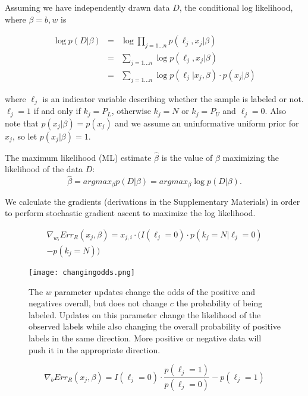 \documentclass{article}
\begin{document}
Assuming we have independently drawn data $D$, the conditional log likelihood, where $\beta = b, w$ is

\begin{eqnarray*}
\log{p(D | \beta)} &=& \log \prod_{j=1...n}{p(\ell_j, x_j | \beta)} \\
 &=& \sum_{j=1...n}{\log{p(\ell_j, x_j | \beta)}} \\
 &=& \sum_{j=1...n}{\log{p(\ell_j | x_j, \beta)}} \cdot p(x_j | \beta)
\end{eqnarray*}

where $\ell_j$ is an indicator variable describing whether the sample is labeled or not. $\ell_j = 1$ if and only if $k_j=P_L$, otherwise $k_j = N$ or $k_j=P_U$ and $\ell_j = 0$.  Also note that $p(x_j|\beta) = p(x_j)$ and we assume an uninformative uniform prior for $x_j$, so let $p(x_j|\beta) = 1$.

The maximum likelihood (ML) estimate $\hat \beta$ is the value of $\beta$ maximizing the likelihood of the data $D$:
$$
\hat \beta = arg max_{\beta} p(D | \beta) = arg max_{\beta} \log{p(D | \beta)}.
$$

We calculate the gradients (derivations in the Supplementary Materials) in order to perform stochastic gradient ascent to maximize the log likelihood.

\begin{eqnarray*}
\nabla_{w_i}{Err_R (x_j, \beta)} = x_{j,i} \cdot
    \big(	I(\ell_j=0) \cdot p(k_j=N | \ell_j=0) \\
		- p(k_j=N)
    \big)
\end{eqnarray*}

\begin{figure}[ht!]
\vskip 0.2in
\begin{center}
\centerline{\texttt{[image: changingodds.png]}}
\caption{The $w$ parameter updates change the odds of the positive and negatives overall, but does not change $c$ the probability of being labeled. Updates on this parameter change the likelihood of the observed labels while also changing the overall probability of positive labels in the same direction. More positive or negative data will push it in the appropriate direction. }
\label{changingodds}
\end{center}
\vskip -0.2in
\end{figure}

$$\nabla_{b}{Err_R (x_j, \beta)}  = I(\ell_j=0) \cdot
		\frac{p(\ell_j=1)}{p(\ell_j=0)}
		-
		 p(\ell_j=1)$$
\end{document}
